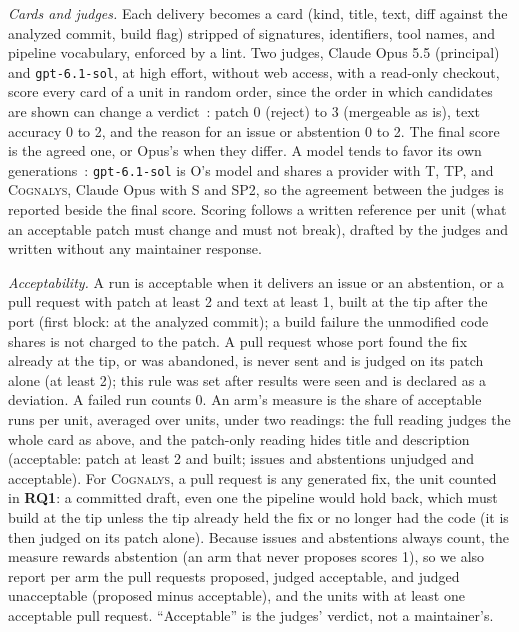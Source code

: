 \documentclass[conference]{IEEEtran}
\newcommand{\system}{\textsc{Cognalys}}
\newcommand{\researchq}[1]{\textbf{RQ#1}}
\begin{document}
\emph{Cards and judges.} Each delivery becomes a card (kind, title, text,
diff against the analyzed commit, build flag) stripped of signatures,
identifiers, tool names, and pipeline vocabulary, enforced by a lint. Two
judges, Claude Opus 5.5 (principal) and \texttt{gpt-6.1-sol}, at high effort,
without web access, with a read-only checkout, score every card of a unit in
random order, since the order in which candidates are shown can change a
verdict~\cite{wang2024fair}: patch 0 (reject) to 3 (mergeable as is), text
accuracy 0 to 2, and the reason for an issue or abstention 0 to 2. The final
score is the agreed one, or Opus's when they differ. A model tends to favor
its own generations~\cite{panickssery2024selfpref}: \texttt{gpt-6.1-sol} is
O's model and shares a provider with T, TP, and {\system}, Claude Opus with S
and SP2, so the agreement between the judges is reported beside the final
score. Scoring follows a
written reference per unit (what an acceptable patch must change and must not
break), drafted by the judges and written without any maintainer response.

\emph{Acceptability.} A run is acceptable when it delivers an issue or an
abstention, or a pull request with patch at least 2 and text at least 1,
built at the tip after the port (first block: at the analyzed commit); a
build failure the unmodified code shares is not charged to the patch. A pull
request whose port found the fix already at the tip, or was abandoned, is
never sent and is judged on its patch alone (at least 2); this rule was set
after results were seen and is declared as a deviation.
A failed run counts 0. An arm's measure is the share of acceptable runs per
unit, averaged over units, under two readings: the full reading judges the
whole card as above, and the patch-only reading hides title and description
(acceptable: patch at least 2 and built; issues and abstentions unjudged and
acceptable). For {\system}, a pull request is any generated fix, the unit counted in
\researchq{1}: a committed draft, even one the pipeline would hold back, which
must build at the tip unless the tip already held the fix or no longer had the
code (it is then judged on its patch alone). Because issues and abstentions always
count, the measure rewards abstention (an arm that never proposes scores 1),
so we also report per arm the pull requests proposed, judged acceptable, and
judged unacceptable (proposed minus acceptable), and the units with at least
one acceptable pull request. ``Acceptable'' is the judges' verdict, not a
maintainer's.
\end{document}

